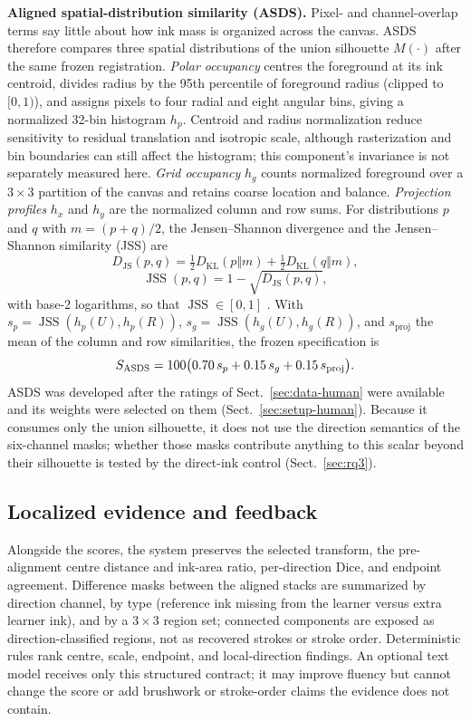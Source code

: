 \medskip
\noindent\textbf{Aligned spatial-distribution similarity (ASDS).}
Pixel- and channel-overlap terms say little about how ink mass is organized
across the canvas. ASDS therefore compares three spatial distributions of
the union silhouette \(M(\cdot)\) after the same frozen registration. \emph{Polar occupancy} centres the foreground at
its ink centroid, divides radius by the 95th percentile of foreground radius
(clipped to \([0,1)\)), and assigns pixels to four radial and eight angular
bins, giving a normalized 32-bin histogram \(h_p\). Centroid and radius
normalization reduce sensitivity to residual translation and isotropic
scale, although rasterization and bin boundaries can still affect the
histogram; this component's invariance is not separately measured here.
\emph{Grid occupancy} \(h_g\) counts normalized foreground over a
\(3\times3\) partition of the canvas and retains coarse location and
balance. \emph{Projection profiles} \(h_x\) and \(h_y\) are the normalized
column and row sums. For distributions \(p\) and \(q\) with \(m=(p+q)/2\), the
Jensen--Shannon divergence and the Jensen--Shannon similarity (JSS) are
\[
D_{\mathrm{JS}}(p,q)
=\tfrac{1}{2}D_{\mathrm{KL}}(p\Vert m)
+\tfrac{1}{2}D_{\mathrm{KL}}(q\Vert m),
\]
\[
\operatorname{JSS}(p,q)=1-\sqrt{D_{\mathrm{JS}}(p,q)},
\]
with base-2 logarithms, so that \(\operatorname{JSS}\in[0,1]\)
\cite{lin1991jensen}. With
\(s_p=\operatorname{JSS}(h_p(U),h_p(R))\),
\(s_g=\operatorname{JSS}(h_g(U),h_g(R))\), and
\(s_{\mathrm{proj}}\) the mean of the column and row similarities, the
frozen specification is
\[
S_{\mathrm{ASDS}}=100\bigl(
0.70\,s_p+0.15\,s_g+0.15\,s_{\mathrm{proj}}
\bigr).
\]
ASDS was developed after the ratings of Sect.~\ref{sec:data-human} were
available and its weights were selected on them
(Sect.~\ref{sec:setup-human}). Because it consumes only the union silhouette, it does not use the direction
semantics of the six-channel masks; whether those masks contribute anything
to this scalar beyond their silhouette is tested by the direct-ink control
(Sect.~\ref{sec:rq3}).

\subsection{Localized evidence and feedback}
\label{sec:evidence}

Alongside the scores, the system preserves the selected transform, the
pre-alignment centre distance and ink-area ratio, per-direction Dice, and
endpoint agreement. Difference masks between the aligned stacks are
summarized by direction channel, by type (reference ink missing from the
learner versus extra learner ink), and by a \(3\times3\) region set;
connected components are exposed as direction-classified regions, not as
recovered strokes or stroke order.
Deterministic rules rank centre, scale, endpoint, and local-direction
findings. An optional text model receives only this structured contract; it may
improve fluency but cannot change the score or add brushwork or stroke-order
claims the evidence does not contain.
